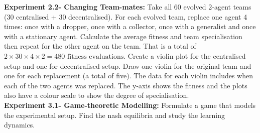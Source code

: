 \documentclass[12pt]{article}
\begin{document}
\textbf{Experiment 2.2- Changing Team-mates:} Take all 60 evolved 2-agent teams (30 centralised + 30 decentralised).
For each evolved team, replace one agent 4 times: once with a dropper, once with a collector, once with a generalist and once with a stationary agent.
Calculate the average fitness and team specialisation then repeat for the other agent on the team.
That is a total of $2 \times 30 \times 4 \times 2= 480 \mbox{ fitness evaluations}$. 
Create a violin plot for the centralised setup and one for decentralised setup.
Draw one violin for the original team and one for each replacement (a total of five).
The data for each violin includes when each of the two agents was replaced.
The y-axis shows the fitness and the plots also have a colour scale to show the degree of specialisation.\\

\textbf{Experiment 3.1- Game-theoretic Modelling:} Formulate a game that models the experimental setup. 
Find the nash equilibria and study the learning dynamics.\\
\end{document}
